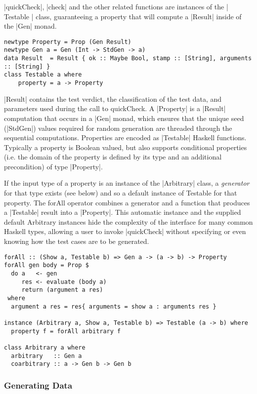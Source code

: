 |quickCheck|, |check| and the other related functions are instances of the | Testable | class,
guaranteeing a property that will compute a |Result| inside of the |Gen| monad.

\begin{lstlisting}
newtype Property = Prop (Gen Result)
newtype Gen a = Gen (Int -> StdGen -> a)
data Result  = Result { ok :: Maybe Bool, stamp :: [String], arguments :: [String] }
class Testable a where
    property = a -> Property
\end{lstlisting}

\noindent |Result| contains the test verdict, the classification of the test data,
and parameters used during the call to quickCheck.
A |Property| is a |Result| computation that occurs in a |Gen| monad,
which ensures that the unique seed (|StdGen|) values required for random generation
are threaded through the sequential computations.
Properties are encoded as |Testable| Haskell functions.
Typically a property is Boolean valued,
but \QC also supports conditional properties 
(i.e. the domain of the property is defined by its type
and an additional precondition) of type |Property|.

If the input type of a property is an instance of the |Arbitrary| class,
a \emph{generator} for that type exists (see below)
and so a default instance of Testable for that property.
The forAll operator combines a generator and 
a function that produces a |Testable| result into a |Property|.  
This automatic instance and the supplied default Arbitrary instances
hide the complexity of the interface for many common Haskell types,
allowing a user to invoke |quickCheck| 
without specifying or even knowing how the test cases are to be generated.

\begin{lstlisting}
forAll :: (Show a, Testable b) => Gen a -> (a -> b) -> Property
forAll gen body = Prop $
  do a   <- gen
     res <- evaluate (body a)
     return (argument a res)
 where
  argument a res = res{ arguments = show a : arguments res }

instance (Arbitrary a, Show a, Testable b) => Testable (a -> b) where
  property f = forAll arbitrary f

class Arbitrary a where
  arbitrary   :: Gen a
  coarbitrary :: a -> Gen b -> Gen b

\end{lstlisting}

\subsubsection{Generating Data}

